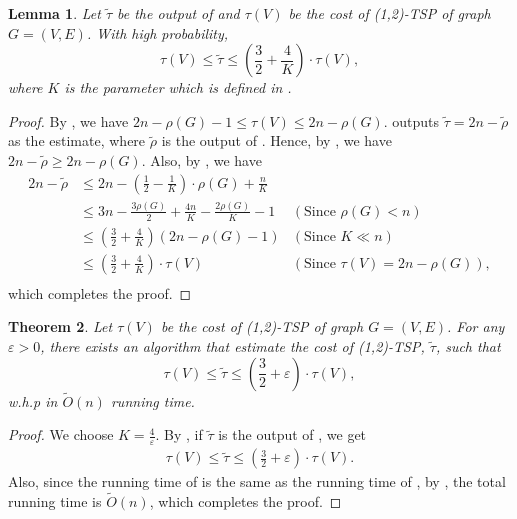 \documentclass[letterpaper,11pt]{article}
\renewcommand{\epsilon}{\varepsilon}
\newcommand{\tspsize}[1]{\ensuremath{\tau}(#1)}
\newcommand{\algtwo}[0]{\Cref{alg:path-cover22}}
\newtheorem{theorem}{Theorem}[section]
\newtheorem{lemma}[theorem]{Lemma}
\newenvironment{myproof}{
\vspace{-0.5cm}
\begin{proof}
}{
\end{proof}
}
\begin{document}
\begin{lemma}\label{lem: 12tsp-approx}
Let $\tilde{\tau}$ be the output of  and $\tspsize{V}$ be the cost of (1,2)-TSP of graph $G = (V, E)$. With high probability,
$$
\tspsize{V} \leq \tilde{\tau} \leq (\frac{3}{2} + \frac{4}{K})\cdot \tspsize{V},
$$
where $K$ is the parameter which is defined in \algtwo{}.
\end{lemma}
\begin{myproof}
By , we have $2n - \rho(G) - 1 \leq \tspsize{V} \leq 2n - \rho(G)$.  outputs $\tilde{\tau} = 2n - \tilde{\rho}$ as the estimate, where $\tilde{\rho}$ is the output of . Hence, by , we have $2n - \tilde{\rho} \geq 2n - \rho(G)$. Also, by , we have 
\begin{align*}
    2n - \tilde{\rho} & \leq 2n - (\frac{1}{2} - \frac{1}{K})\cdot \rho(G) + \frac{n}{K} \\
    & \leq 3n - \frac{3\rho(G)}{2} + \frac{4n}{K} - \frac{2\rho(G)}{K} - 1 & (\text{Since } \rho(G) < n)\\
    & \leq (\frac{3}{2} + \frac{4}{K})(2n - \rho(G) - 1) & (\text{Since } K \ll n) \\
    & \leq (\frac{3}{2} + \frac{4}{K})\cdot\tspsize{V} & (\text{Since } \tspsize{V} = 2n - \rho(G)),\\
\end{align*}
which completes the proof.
\end{myproof}

\begin{theorem}\label{thm: 12tsp}
Let $\tspsize{V}$ be the cost of (1,2)-TSP of graph $G = (V, E)$. For any $\epsilon > 0$, there exists an algorithm that estimate the cost of (1,2)-TSP, $\tilde{\tau}$, such that
$$
\tspsize{V} \leq \tilde{\tau} \leq (\frac{3}{2} + \epsilon)\cdot \tspsize{V},
$$
w.h.p in $\tilde{O}(n)$ running time.
\end{theorem}
\begin{myproof}
We choose $K = \frac{4}{\epsilon}$. By , if $\tilde{\tau}$ is the output of , we get
\begin{align*}
    \tspsize{V} \leq \tilde{\tau} \leq (\frac{3}{2} + \epsilon)\cdot \tspsize{V}.
\end{align*}
Also, since the running time of  is the same as the running time of , by , the total running time is $\tilde{O}(n)$, which completes the proof.
\end{myproof}
\end{document}
